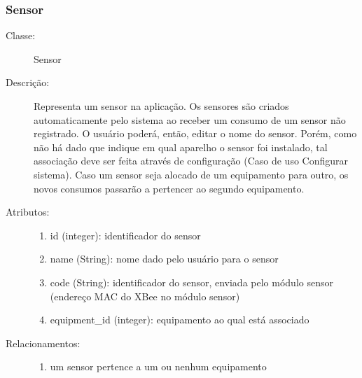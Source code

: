\subsubsection{Sensor}
\begin{description}
	\item[Classe:] Sensor
	\item[Descrição:] Representa um sensor na aplicação. Os sensores são criados automaticamente pelo sistema ao receber um consumo de um sensor não registrado. O usuário poderá, então, editar o nome do sensor. Porém, como não há dado que indique em qual aparelho o sensor foi instalado, tal associação deve ser feita através de configuração (Caso de uso Configurar sistema). Caso um sensor seja alocado de um equipamento para outro, os novos consumos passarão a pertencer ao segundo equipamento.
	\item[Atributos:] \hfill
		\begin{enumerate}
			\item id (integer): identificador do sensor
			\item name (String): nome dado pelo usuário para o sensor
			\item code (String): identificador do sensor, enviada pelo módulo sensor (endereço MAC do XBee no módulo sensor)
			\item equipment\_id (integer): equipamento ao qual está associado
		\end{enumerate}
	\item[Relacionamentos:] \hfill
		\begin{enumerate}
			\item um sensor pertence a um ou nenhum equipamento
		\end{enumerate}
\end{description} 
%
